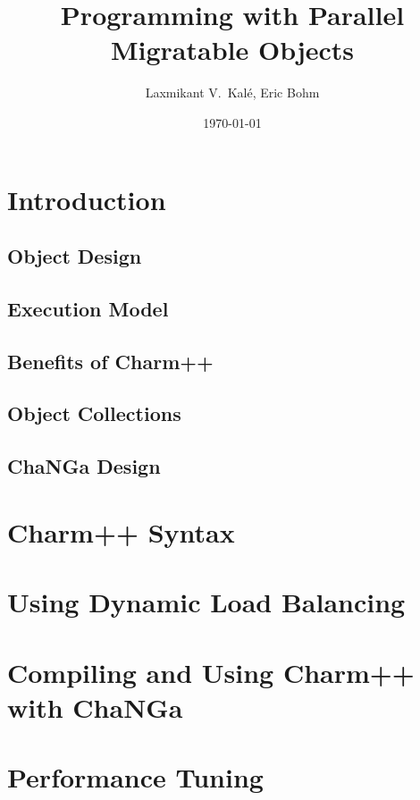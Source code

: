 \documentclass{beamer}
\title[Parallel Migratable Objects]{Programming with Parallel Migratable Objects}
\institute[UIUC]{Parallel Programming Laboratory \\University of Illinois Urbana-Champaign}
\author{Laxmikant V.~Kal\'e, Eric Bohm}
\date{\today}
\begin{document}
\frame{\titlepage}

\section[Concepts]{Introduction}

\subsection[Object Design]{Object Design}


\subsection[Execution Mode]{Execution Model}

\subsection[Benefits]{Benefits of Charm++}

\subsection[Collections]{Object Collections}

\subsection[ChaNGa Design]{ChaNGa Design}

\section[Charm++]{Charm++ Syntax}
\section[LB]{Using Dynamic Load Balancing}

\section[ChaNGa]{Compiling and Using Charm++ with ChaNGa}

\section[Tuning]{Performance Tuning}


\end{document}
